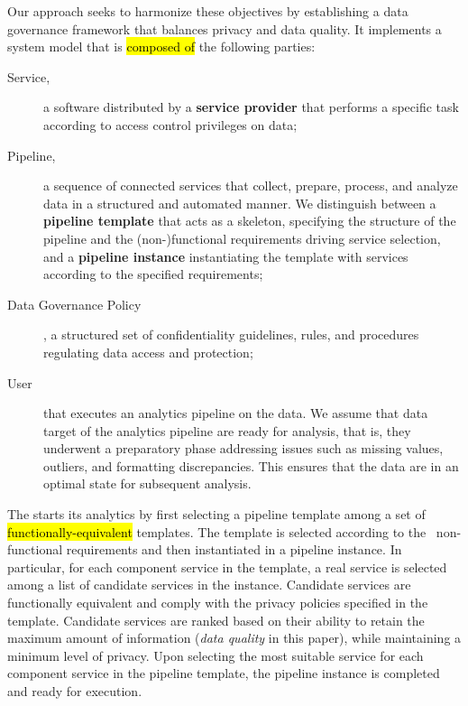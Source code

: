 Our approach seeks to harmonize these objectives by establishing a data governance framework that balances privacy and data quality. It implements a system model that is \hl{composed of} the following parties:
\begin{description}
  \item[Service,] a software distributed by a \textbf{service provider} that performs a specific task according to access control privileges on data; %
  \item[Pipeline,] a sequence of connected services that collect, prepare, process, and analyze data in a structured and automated manner. We distinguish between a \textbf{pipeline template} that acts as a skeleton, specifying the structure of the pipeline and the (non-)functional requirements driving  service selection, and a \textbf{pipeline instance} instantiating the template with services according to the specified requirements;
    \item[Data Governance Policy], a structured set of confidentiality guidelines, rules, and procedures regulating data access and protection;
  \item[User] that executes an analytics pipeline on the data. We assume that data target of the analytics pipeline are ready for analysis, that is, they underwent a preparatory phase addressing issues such as missing values, outliers, and formatting discrepancies. This ensures that the data are in an optimal state for subsequent analysis.
\end{description}

The \user starts its analytics by first selecting a pipeline template among a set of \hl{functionally-equivalent} templates. The template is selected according to the \user\ non-functional requirements and then instantiated in a pipeline instance. In particular, for each component service in the template, a real service is selected among a list of candidate services in the instance. Candidate services are functionally equivalent and comply with the privacy policies specified in the template.
Candidate services are ranked based on their ability to retain the maximum amount of information (\emph{data quality} in this paper), while maintaining a minimum level of privacy.
Upon selecting the most suitable service for each component service in the pipeline template, the pipeline instance is completed and ready for execution.


